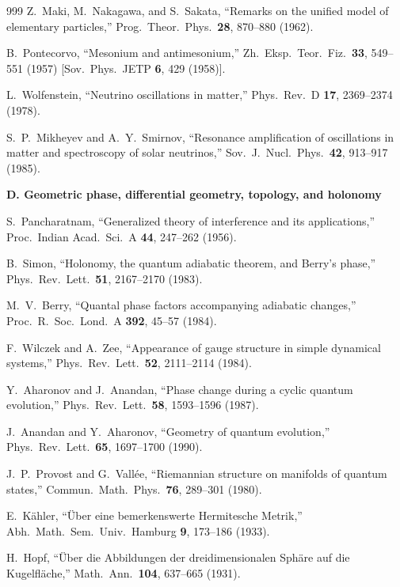 \begin{thebibliography}{999}
Z.~Maki, M.~Nakagawa, and S.~Sakata,
``Remarks on the unified model of elementary particles,''
Prog.\ Theor.\ Phys.\ \textbf{28}, 870--880 (1962).

B.~Pontecorvo,
``Mesonium and antimesonium,''
Zh.\ Eksp.\ Teor.\ Fiz.\ \textbf{33}, 549--551 (1957)
[Sov.\ Phys.\ JETP \textbf{6}, 429 (1958)].

L.~Wolfenstein,
``Neutrino oscillations in matter,''
Phys.\ Rev.\ D \textbf{17}, 2369--2374 (1978).

S.~P.~Mikheyev and A.~Y.~Smirnov,
``Resonance amplification of oscillations in matter and spectroscopy of solar
neutrinos,'' Sov.\ J.\ Nucl.\ Phys.\ \textbf{42}, 913--917 (1985).

\item[]\textbf{D. Geometric phase, differential geometry, topology, and holonomy}

S.~Pancharatnam,
``Generalized theory of interference and its applications,''
Proc.\ Indian Acad.\ Sci.\ A \textbf{44}, 247--262 (1956).

B.~Simon,
``Holonomy, the quantum adiabatic theorem, and Berry's phase,''
Phys.\ Rev.\ Lett.\ \textbf{51}, 2167--2170 (1983).

M.~V.~Berry,
``Quantal phase factors accompanying adiabatic changes,''
Proc.\ R.\ Soc.\ Lond.\ A \textbf{392}, 45--57 (1984).

F.~Wilczek and A.~Zee,
``Appearance of gauge structure in simple dynamical systems,''
Phys.\ Rev.\ Lett.\ \textbf{52}, 2111--2114 (1984).

Y.~Aharonov and J.~Anandan,
``Phase change during a cyclic quantum evolution,''
Phys.\ Rev.\ Lett.\ \textbf{58}, 1593--1596 (1987).

J.~Anandan and Y.~Aharonov,
``Geometry of quantum evolution,''
Phys.\ Rev.\ Lett.\ \textbf{65}, 1697--1700 (1990).

J.~P.~Provost and G.~Vall\'ee,
``Riemannian structure on manifolds of quantum states,''
Commun.\ Math.\ Phys.\ \textbf{76}, 289--301 (1980).

E.~K\"ahler,
``\"Uber eine bemerkenswerte Hermitesche Metrik,''
Abh.\ Math.\ Sem.\ Univ.\ Hamburg \textbf{9}, 173--186 (1933).

H.~Hopf,
``\"Uber die Abbildungen der dreidimensionalen Sph\"are auf die Kugelfl\"ache,''
Math.\ Ann.\ \textbf{104}, 637--665 (1931).


\end{thebibliography}
